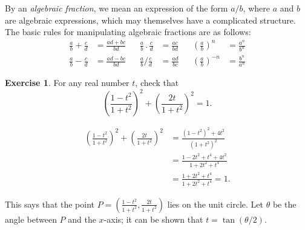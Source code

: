 \documentclass[a4paper]{book}
\newcommand{\PURPLE}[1]{{\color{purple}#1}}
\newcommand{\tht}       {\theta}
\renewcommand{\:}{\colon}
\newcommand{\DEFN}[1]{\PURPLE{\emph{#1}}}
\theoremstyle{definition}
\newtheorem{exercise}[theorem]{Exercise}
\renewenvironment{solution}{\SolutionInline}{\endSolutionInline}
\begin{document}
By an \DEFN{algebraic fraction}, we mean an expression of the form
$a/b$, where $a$ and $b$ are algebraic expressions, which may
themselves have a complicated structure.  The basic rules for
manipulating algebraic fractions are as follows:
\[ \begin{array}{rlcrlcrl}
 \frac{a}{b} + \frac{c}{d} &= \frac{ad+bc}{bd} &&
 \frac{a}{b} \,.\, \frac{c}{d} &= \frac{ac}{bd} &&
 \left(\frac{a}{b}\right)^n &= \frac{a^n}{b^n} \\
 \frac{a}{b} - \frac{c}{d} &= \frac{ad-bc}{bd} &&
 \frac{a}{b} / \frac{c}{d} &= \frac{ad}{bc} &&
 \left(\frac{a}{b}\right)^{-n} &= \frac{b^n}{a^n}
\end{array} \]
\begin{exercise}
 For any real number $t$, check that
 \[ \left(\frac{1-t^2}{1+t^2}\right)^2 +
    \left(\frac{2t}{1+t^2}\right)^2 = 1.
 \]
\end{exercise}
\begin{solution}
 \begin{align*}
  \left(\frac{1-t^2}{1+t^2}\right)^2 +
    \left(\frac{2t}{1+t^2}\right)^2 &=
   \frac{(1-t^2)^2 + 4t^2}{(1+t^2)^2} \\
   &= \frac{1-2t^2+t^4 + 4t^2}{1+2t^2+t^4} \\
   &= \frac{1+2t^2+t^4}{1+2t^2+t^4} = 1.
 \end{align*}
\end{solution}
\begin{background}
 This says that the point
 $P=\left(\frac{1-t^2}{1+t^2},\frac{2t}{1+t^2}\right)$ lies on the
 unit circle.  Let $\tht$ be the angle between $P$ and the $x$-axis;
 it can be shown that $t=\tan(\tht/2)$.
\end{background}
\end{document}
